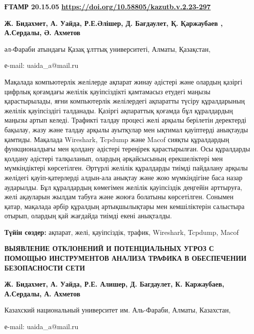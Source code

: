 \newpage
{\bfseries ҒТАМР 20.15.05}
\hfill {\bfseries \href{https://doi.org/10.58805/kazutb.v.2.23-297}{https://doi.org/10.58805/kazutb.v.2.23-297}}


\begin{center}
{\bfseries Ж. Бидахмет, А. Уайда, Р.Е.Әлішер, Д. Бағдаулет, Қ. Қаржаубаев , А.Сердалы, Ә. Ахметов}

әл-Фараби атындағы Қазақ ұлттық университеті, Алматы, Қазақстан,

е-mail: uaida\_a@mail.ru
\end{center}

Мақалада компьютерлік желілерде ақпарат жинау әдістері және олардың
қазіргі цифрлық қоғамдағы желілік қауіпсіздікті қамтамасыз етудегі
маңызы қарастырылады, яғни компьютерлік желілердегі ақпаратты түсіру
құралдарының желілік қауіпсіздігі талданады. Қазіргі ақпараттық қоғамда
бұл құралдардың маңызы артып келеді. Трафикті талдау процесі желі арқылы
берілетін деректерді бақылау, жазу және талдау арқылы ауытқулар мен
ықтимал қауіптерді анықтауды қамтиды. Мақалада Wireshark, Tcpdump және
Macof сияқты құралдардың функционалдығы мен қолдану әдістері тереңірек
қарастырылған. Осы құралдарды қолдану әдістері талқыланып, олардың
әрқайсысының ерекшеліктері мен мүмкіндіктері көрсетілген. Әртүрлі
желілік құралдарды тиімді пайдалану арқылы желідегі қауіп-қатерлерді
алдын-ала анықтау және жою мүмкіндігіне баса назар аударылды. Бұл
құралдардың көмегімен желілік қауіпсіздік деңгейін арттыруға, желі
ақауларын жылдам табуға және жоюға болатыны көрсетілген. Сонымен қатар,
мақалада әрбір құралдың артықшылықтары мен кемшіліктерін салыстыра
отырып, олардың қай жағдайда тиімді екені анықталды.

{\bfseries Түйін сөздер:} ақпарат, желі, қауіпсіздік, трафик, Wireshark,
Tcpdump, Macof

\begin{center}
{\large\bfseries ВЫЯВЛЕНИЕ ОТКЛОНЕНИЙ И ПОТЕНЦИАЛЬНЫХ УГРОЗ С ПОМОЩЬЮ
ИНСТРУМЕНТОВ АНАЛИЗА ТРАФИКА В ОБЕСПЕЧЕНИИ БЕЗОПАСНОСТИ СЕТИ}

{\bfseries Ж. Бидахмет, А. Уайда, Р.Е. Алишер, Д. Багдаулет, К.
Каржаубаев, А.Сердалы, А. Ахметов}

Казахский национальный университет им. Аль-Фараби, Алматы, Казахстан,

е-mail: uaida\_a@mail.ru
\end{center}

